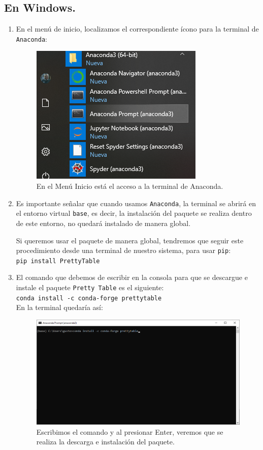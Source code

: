\documentclass[11pt]{article}
\newcommand{\letraconsola}[1]{\texttt{#1}}
\begin{document}
\subsection{En Windows.}
\begin{enumerate}
\item En el menú de inicio, localizamos el correspondiente ícono para la terminal de \letraconsola{Anaconda}:
\begin{figure}[H]
    \centering
    \includegraphics[scale=0.6]{Imagenes/instalacion_paquete_python_01.png}
    \caption{En el Menú Inicio está el acceso a la terminal de Anaconda.}
    \label{fig:figura_02}
\end{figure}
\item Es importante señalar que cuando usamos \letraconsola{Anaconda}, la terminal se abrirá en el entorno virtual \letraconsola{base}, es decir, la instalación del paquete se realiza dentro de este entorno, no quedará instalado de manera global.
\par
Si queremos usar el paquete de manera global, tendremos que seguir este procedimiento desde una terminal de nuestro sistema, para usar \letraconsola{pip}:
\\
\verb|pip install PrettyTable|
\item El comando que debemos de escribir en la consola para que se descargue e instale el paquete \letraconsola{Pretty Table} es el siguiente:
\\
\verb|conda install -c conda-forge prettytable|
\\
En la terminal quedaría así:
\begin{figure}[H]
    \centering
    \includegraphics[scale=0.6]{Imagenes/instalacion_paquete_python_02.png}
    \caption{Escribimos el comando y al presionar Enter, veremos que se realiza la descarga e instalación del paquete.}
    \label{fig:figura_03}
\end{figure}
\end{enumerate}
\end{document}
